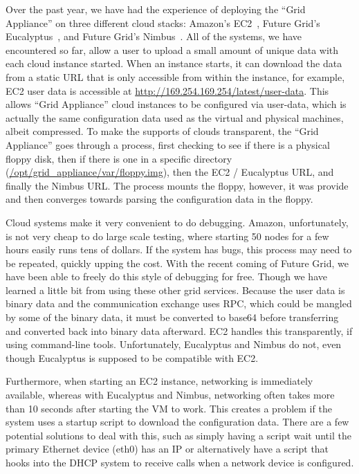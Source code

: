 \documentclass[conference]{IEEEtran}
\begin{document}
Over the past year, we have had the experience of deploying the ``Grid
Appliance'' on three different cloud stacks:  Amazon's EC2~\cite{ec2}, Future
Grid's Eucalyptus~\cite{eucalyptus}, and Future Grid's Nimbus~\cite{nimbus}.
All of the systems, we have encountered so far, allow a user to upload a small
amount of unique data with each cloud instance started.  When an instance
starts, it can download the data from a static URL that is only accessible from
within the instance, for example, EC2 user data is accessible at
\url{http://169.254.169.254/latest/user-data}.  This allows ``Grid Appliance''
cloud instances to be configured via user-data, which is actually the same
configuration data used as the virtual and physical machines, albeit
compressed.  To make the supports of clouds transparent, the ``Grid Appliance''
goes through a process, first checking to see if there is a physical floppy
disk, then if there is one in a specific directory
(\url{/opt/grid\_appliance/var/floppy.img}), then the EC2 / Eucalyptus URL, and
finally the Nimbus URL.  The process mounts the floppy, however, it was provide
and then converges towards parsing the configuration data in the floppy.

Cloud systems make it very convenient to do debugging.  Amazon, unfortunately,
is not very cheap to do large scale testing, where starting 50 nodes for a few
hours easily runs tens of dollars.  If the system has bugs, this process may
need to be repeated, quickly upping the cost.  With the recent coming of Future
Grid, we have been able to freely do this style of debugging for free.  Though
we have learned a little bit from using these other grid services.  Because the
user data is binary data and the communication exchange uses RPC, which could
be mangled by some of the binary data, it must be converted to base64 before
transferring and converted back into binary data afterward.  EC2 handles this
transparently, if using command-line tools.  Unfortunately, Eucalyptus and
Nimbus do not, even though Eucalyptus is supposed to be compatible with EC2.

Furthermore, when starting an EC2 instance, networking is immediately
available, whereas with Eucalyptus and Nimbus, networking often takes more than
10 seconds after starting the VM to work.  This creates a problem if the system
uses a startup script to download the configuration data.  There are a few
potential solutions to deal with this, such as simply having a script wait
until the primary Ethernet device (eth0) has an IP or alternatively have a
script that hooks into the DHCP system to receive calls when a network device
is configured.
\end{document}
